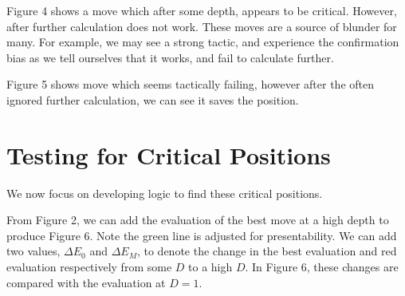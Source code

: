 \documentclass{article}
\begin{document}
\begin{center}
\end{center}

Figure 4 shows a move which after some depth, appears to be critical. However, after further calculation does not work. These moves are a source of blunder for many. For example, we may see a strong tactic, and experience the confirmation bias as we tell ourselves that it works, and fail to calculate further.

\begin{center}
\end{center}

Figure 5 shows move which seems tactically failing, however after the often ignored further calculation, we can see it saves the position.

\section{Testing for Critical Positions}
We now focus on developing logic to find these critical positions.

From Figure 2, we can add the evaluation of the best move at a high depth to produce Figure 6. Note the green line is adjusted for presentability. We can add two values, $\Delta E_0$ and $\Delta E_M$, to denote the change in the best evaluation and red evaluation respectively from some $D$ to a high $D$. In Figure 6, these changes are compared with the evaluation at $D=1$.
\end{document}
